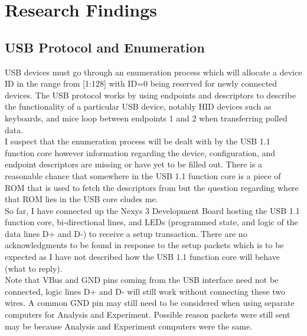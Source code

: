 \documentclass[10pt,a4paper]{article}
\begin{document}
\section{Research Findings}
\subsection{USB Protocol and Enumeration}
USB devices must go through an enumeration process which will allocate a device ID in the range from [1:128] with ID=0 being reserved for newly connected devices. The USB protocol works by using endpoints and descriptors to describe the functionality of a particular USB device, notably HID devices such as keyboards, and mice loop between endpoints 1 and 2 when transferring polled data.\\

I suspect that the enumeration process will be dealt with by the USB 1.1 function core however information regarding the device, configuration, and endpoint descriptors are missing or have yet to be filled out. There is a reasonable chance that somewhere in the USB 1.1 function core is a piece of ROM that is used to fetch the descriptors from but the question regarding where that ROM lies in the USB core eludes me.\\

So far, I have connected up the Nexys 3 Development Board hosting the USB 1.1 function core, bi-directional lines, and LEDs (programmed state, and logic of the data lines D+ and D-) to receive a setup transaction. There are no acknowledgments to be found in response to the setup packets which is to be expected as I have not described how the USB 1.1 function core will behave (what to reply).\\

Note that VBus and GND pins coming from the USB interface need not be connected, logic lines D+ and D- will still work without connecting these two wires. A common GND pin may still need to be considered when using separate computers for Analysis and Experiment. Possible reason packets were still sent may be because Analysis and Experiment computers were the same. \\
\end{document}
